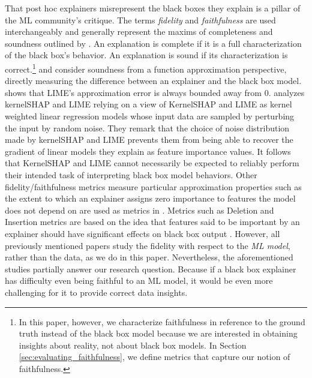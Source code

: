 \documentclass[12pt]{article}  %
\begin{document}
    
        That post hoc explainers misrepresent the black boxes they explain is a pillar of the ML community's critique. The terms \emph{fidelity} and \emph{faithfulness} are used interchangeably and generally represent the maxims of completeness and soundness outlined by \cite{zhou21evaluating}. An explanation is complete if it is a full characterization of the black box's behavior. An explanation is sound if its characterization is correct.\footnote{In this paper, however, we characterize faithfulness in reference to the ground truth instead of the black box model because we are interested in obtaining insights about reality, not about black box models. In Section \ref{sec:evaluating_faithfulness}, we define metrics that capture our notion of faithfulness.} 
    \cite{garreau2020looking} and \cite{han22which} consider soundness from a function approximation perspective, directly measuring the difference between an explainer  and the black box model. \cite{garreau2020looking} shows that LIME's approximation error is always bounded away from 0. \cite{han22which} analyzes kernelSHAP and LIME relying on a view of KernelSHAP and LIME as kernel weighted linear regression models whose input data are sampled by perturbing the input by random noise. They remark that the choice of noise distribution made by kernelSHAP and LIME prevents them from being able to recover the gradient of linear models they explain as feature importance values. It follows that KernelSHAP and LIME cannot necessarily be expected to reliably perform their intended task of interpreting black box model behaviors. 
Other fidelity/faithfulness metrics measure particular approximation properties such as the extent to which an explainer assigns zero importance to features the model does not depend on are used as metrics in \cite{nguyen2020quantitative}. Metrics such as Deletion and Insertion metrics are based on the idea that features said to be important by an explainer should have significant effects on black box output \citep{deyoung20eraser,nguyen2020quantitative,alvarez18robustness,luss2021leveraging}. However, all previously mentioned papers study the fidelity with respect to the \textit{ML model}, rather than the data, as we do in this paper. Nevertheless, the aforementioned studies partially answer our research question. Because if a black box explainer has difficulty even being faithful to an ML model, it would be even more challenging for it to provide correct data insights.
    
\end{document}
